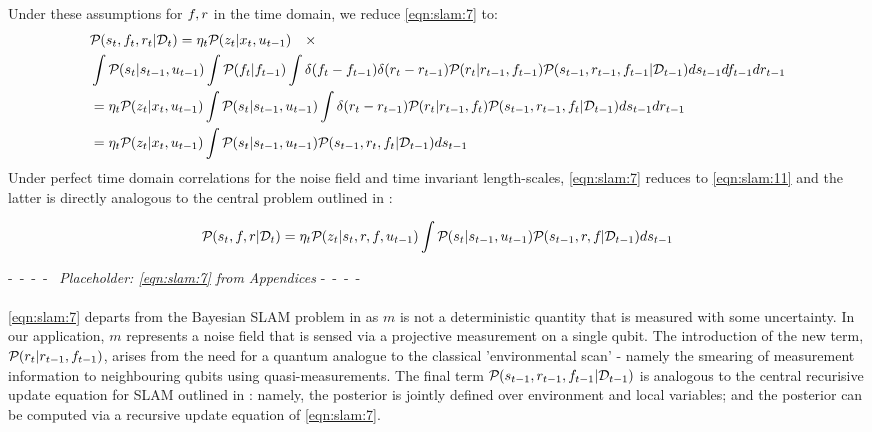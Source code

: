 \begin{widetext}
	Under these assumptions for $f_{ }, r$ in the time domain, we reduce \cref{eqn:slam:7} to:
	\begin{align}
	&\mathcal{P}_{} ( s_t, f_{ t}, r_t | \mathcal{D}_t ) = \eta_t\mathcal{P}_{} ( z_t | x_t, u_{t-1} )\quad  \times \nonumber \\
	& \int \mathcal{P}_{} (  s_t| s_{t-1}, u_{t-1} )  \int \mathcal{P}_{} (  f_{ t}|  f_{ t-1} ) \int \delta(f_{ t} - f_{ t-1})  \delta(r_{t} - r_{t-1})  \mathcal{P}_{} (  r_t|  r_{t-1}, f_{ t-1} ) \mathcal{P}_{} ( s_{t-1}, r_{t-1}, f_{ t-1}| \mathcal{D}_{t-1} )  ds_{t-1} df_{ t-1} dr_{t-1}   \label{eqn:slam:8}  \\
	& = \eta_t\mathcal{P}_{} ( z_t | x_t, u_{t-1} ) \int \mathcal{P}_{} (  s_t| s_{t-1}, u_{t-1} ) \int \delta(r_{t} - r_{t-1})  \mathcal{P}_{} (  r_t|  r_{t-1}, f_{ t} ) \mathcal{P}_{} ( s_{t-1}, r_{t-1}, f_{ t}| \mathcal{D}_{t-1} )  ds_{t-1}  dr_{t-1}   \label{eqn:slam:9}  \\
	& = \eta_t\mathcal{P}_{} ( z_t | x_t, u_{t-1} ) \int \mathcal{P}_{} (  s_t| s_{t-1}, u_{t-1} ) \mathcal{P}_{} ( s_{t-1}, r_t, f_{ t}| \mathcal{D}_{t-1} )  ds_{t-1}    \label{eqn:slam:10}
	\end{align} 
	Under perfect time domain correlations for the noise field and time invariant length-scales, \cref{eqn:slam:7} reduces to \cref{eqn:slam:11} and the latter is directly analogous to the central problem outlined in \cite{thrun2001probabilistic}:
	
	\begin{align}
	\mathcal{P}_{} ( s_t, f_{ }, r | \mathcal{D}_t )  = \eta_t\mathcal{P}_{} ( z_t | s_t, r, f_{ }, u_{t-1} ) \int \mathcal{P}_{} (  s_t| s_{t-1}, u_{t-1} ) \mathcal{P}_{} ( s_{t-1}, r, f_{ }| \mathcal{D}_{t-1} )  ds_{t-1}    \label{eqn:slam:11}
	\end{align}
	
\end{widetext}
-~-~-~-~  \textit{Placeholder: \cref{eqn:slam:7} from Appendices} -~-~-~-~  \\
\\
\cref{eqn:slam:7} departs from the Bayesian SLAM problem in \cite{thrun2001probabilistic} as $m$ is not a deterministic quantity that is measured with some uncertainty. In our application, $m$ represents a noise field that is sensed via a projective measurement on a single qubit. The introduction of the new term, $ \mathcal{P}_{} (  r_t|  r_{t-1}, f_{ t-1} )$, arises from the need for a quantum analogue to the classical 'environmental scan' - namely the smearing of measurement information to neighbouring qubits using quasi-measurements. The final term $\mathcal{P}_{} ( s_{t-1}, r_{t-1}, f_{ t-1}| \mathcal{D}_{t-1} )$ is analogous to the central recurisive update equation for SLAM outlined in \cite{thrun2001probabilistic}: namely, the posterior is jointly defined over environment and local variables; and the posterior can be computed via a recursive update equation of \cref{eqn:slam:7}. \\
